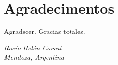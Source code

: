 \chapter*{Agradecimentos}

Agradecer. Gracias totales.







\begin{flushright}
  \textit{Rocío Belén Corral} \\
  \textit{Mendoza, Argentina} \\
  \textit{\DTMMonthname{\month} \number\year}
\end{flushright}

